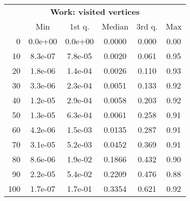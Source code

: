 \begin{tabular}{r|ccccc}
  \multicolumn{6}{c}{{\bf Work: visited vertices}} \\
  & Min & 1st q. & Median & 3rd q. & Max \\ \hline\hline
  0 & 0.0e+00 & 0.0e+00 & 0.0000 & 0.000 & 0.00
\\ 10 & 8.3e-07 & 7.8e-05 & 0.0020 & 0.061 & 0.95
\\ 20 & 1.8e-06 & 1.4e-04 & 0.0026 & 0.110 & 0.93
\\ 30 & 3.3e-06 & 2.3e-04 & 0.0051 & 0.133 & 0.92
\\ 40 & 1.2e-05 & 2.9e-04 & 0.0058 & 0.203 & 0.92
\\ 50 & 1.3e-05 & 6.3e-04 & 0.0061 & 0.258 & 0.91
\\ 60 & 4.2e-06 & 1.5e-03 & 0.0135 & 0.287 & 0.91
\\ 70 & 3.1e-05 & 5.2e-03 & 0.0452 & 0.369 & 0.91
\\ 80 & 8.6e-06 & 1.9e-02 & 0.1866 & 0.432 & 0.90
\\ 90 & 2.2e-05 & 5.4e-02 & 0.2209 & 0.476 & 0.88
\\ 100 & 1.7e-07 & 1.7e-01 & 0.3354 & 0.621 & 0.92
\end{tabular}
